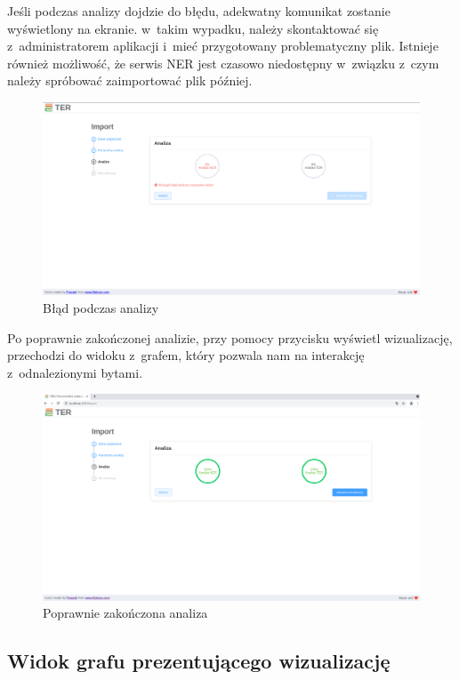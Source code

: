 \documentclass[12pt, a4paper]{article}
\begin{document}
Jeśli podczas analizy dojdzie do błędu, adekwatny komunikat zostanie wyświetlony na ekranie. w~takim wypadku, należy skontaktować się z~administratorem aplikacji i~mieć przygotowany problematyczny plik. Istnieje również możliwość, że serwis NER jest czasowo niedostępny w~związku z~czym należy spróbować zaimportować plik później.

\begin{figure}[H]
  \centering
  \includegraphics[width=\linewidth]{images/analiza-error.png}
  \caption{Błąd podczas analizy}
\end{figure}

Po poprawnie zakończonej analizie, przy pomocy przycisku wyświetl wizualizację, przechodzi do widoku z~grafem, który pozwala nam na interakcję z~odnalezionymi bytami.

\begin{figure}[H]
  \centering
  \includegraphics[width=\linewidth]{images/analiza-success.png}
  \caption{Poprawnie zakończona analiza}
\end{figure}

\subsection{Widok grafu prezentującego wizualizację}\label{section:graph}
\end{document}
